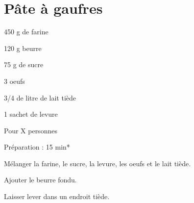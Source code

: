 \section{Pâte à  gaufres}

\begin{ingredients}
\item 450 g de farine
\item 120 g beurre
\item 75 g de sucre
\item 3 oeufs
\item 3/4 de litre de lait tiède
\item 1 sachet de levure
\end{ingredients}
\begin{infos}
\item Pour X personnes		%
\item Préparation : 15 min*		%
\end{infos}
\begin{etapes}
\item Mélanger la farine, le sucre, la levure, les oeufs et le lait tiède.
\item Ajouter le beurre fondu.
\item Laisser lever dans un endroit tiède.
\end{etapes}
\begin{conseils}
\end{conseils}
